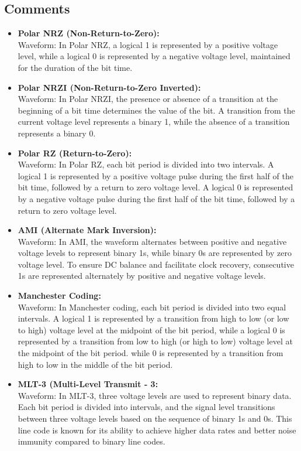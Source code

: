 \documentclass[a4paper, 12pt, english]{article}
\begin{document}
\newpage
\subsection{Comments}
\begin{itemize}
    \item \textbf{Polar NRZ (Non-Return-to-Zero):} \\
    Waveform: In Polar NRZ, a logical 1 is represented by a positive voltage level, while a logical 0 is represented by a negative voltage level, maintained for the duration of the bit time.
    \item \textbf{Polar NRZI (Non-Return-to-Zero Inverted):} \\
    Waveform: In Polar NRZI, the presence or absence of a transition at the beginning of a bit time determines the value of the bit. A transition from the current voltage level represents a binary 1, while the absence of a transition represents a binary 0.
    \item \textbf{Polar RZ (Return-to-Zero):} \\
    Waveform: In Polar RZ, each bit period is divided into two intervals. A logical 1 is represented by a positive voltage pulse during the first half of the bit time, followed by a return to zero voltage level. A logical 0 is represented by a negative voltage pulse during the first half of the bit time, followed by a return to zero voltage level.
    \item \textbf{AMI (Alternate Mark Inversion):} \\
    Waveform: In AMI, the waveform alternates between positive and negative voltage levels to represent binary 1s, while binary 0s are represented by zero voltage level. To ensure DC balance and facilitate clock recovery, consecutive 1s are represented alternately by positive and negative voltage levels.
    \item \textbf{Manchester Coding:} \\
    Waveform: In Manchester coding, each bit period is divided into two equal intervals. A logical 1 is represented by a transition from high to low (or low to high) voltage level at the midpoint of the bit period, while a logical 0 is represented by a transition from low to high (or high to low) voltage level at the midpoint of the bit period.
    while 0 is represented by a transition from high to low in the middle of the bit period.
    \item \textbf{MLT-3 (Multi-Level Transmit - 3:} \\
    Waveform: In MLT-3, three voltage levels are used to represent binary data. Each bit period is divided into intervals, and the signal level transitions between three voltage levels based on the sequence of binary 1s and 0s. This line code is known for its ability to achieve higher data rates and better noise immunity compared to binary line codes.
\end{itemize}
\end{document}
